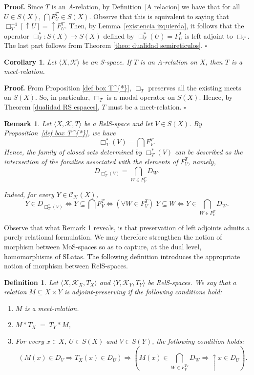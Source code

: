 \documentclass{article}
\newtheorem{definition}{\bf Definition}[section]
\newtheorem{remark}{\bf Remark}[section]
\newtheorem{corollary}{\bf Corollary}[section]
\newenvironment{proof}
{\par\noindent\textbf{Proof. }\rm}
{\hfill$\boldsymbol{\square}$\par\vspace{0.3cm}}
\begin{document}
\begin{proof}
Since $T$ is an $A$-relation, by Definition~\ref{A relacion} we have that for all $U\in S(X)$, $\bigcap F_U^{T} \in S(X)$. Observe that this is equivalent to saying that $\Box_T^{-1}[\uparrow U]=\uparrow F_U^{T}$. Then, by Lemma~\ref{existencia izquierda}, it follows that the operator $\Box_{T}^{\ast}\colon S(X)\to S(X)$ defined by $\Box_{T}^{\ast}(U)=F_U^{T}$ is left adjoint to $\Box_T$. The last part follows from Theorem \ref{theo: dualidad semireticulos}. 
\end{proof}


\begin{corollary}\label{A-rel is meet-rel}
Let $\langle X, \mathcal{K}\rangle$ be an S-space. If $T$ is an A-relation on $X$, then $T$ is a meet-relation.
\end{corollary}
\begin{proof}
    From Proposition \ref{def box T^{*}}, $\Box_T$ preserves all the existing meets on $S(X)$. So, in particular, $\Box_T$ is a modal operator on $S(X)$. Hence, by Theorem \ref{dualidad RS espaces}, $T$ must be a meet-relation.
\end{proof}

\begin{remark}\label{interseccion}
Let $\langle X, \mathcal{K}, T \rangle$ be a RelS-space and let $V \in S(X)$. By Proposition~\ref{def box T^{*}}, we have
\[
\Box_T^{*}(V)=\bigcap F_V^T.
\]
Hence, the family of closed sets determined by $\Box_T^{*}(V)$ can be described as the intersection of the families associated with the elements of $F_V^T$, namely,
\[
D_{\Box_{T}^{*}(V)}
=
\bigcap_{W \in F^{T}_V} D_W.
\]

Indeed, for every $Y\in \mathcal{C}_{\mathcal{K}}(X)$,
\[
Y \in D_{\Box_{T}^{*}(V)}
\iff
Y \subseteq \bigcap F_V^T
\iff
(\forall W\in F_V^T)\; Y\subseteq W
\iff
Y\in \bigcap_{W\in F_V^T} D_W.
\]
\end{remark}

Observe that what Remark \ref{interseccion} reveals, is that preservation of left adjoints admits a purely relational formulation. We may therefore strengthen the notion of morphism between MoS-spaces so as to capture, at the dual level, homomorphisms of SLatas. The following definition introduces the appropriate notion of morphism between RelS-spaces.

\begin{definition}\label{relacion apropiada}
    Let $\langle X, \mathcal{K}_X, T_X \rangle$ and $\langle Y, \mathcal{K}_Y, T_Y \rangle$ be RelS-spaces. We say that a relation  $M\subseteq X\times Y$ is adjoint-preserving if the following conditions hold: 
    \begin{enumerate}
        \item $M$ is a meet-relation.
        \item $M * T_X \;=\; T_Y * M $,
        \item For every $x\in X$, $U\in S(X)$ and $V\in S(Y)$, the following condition holds: 
        \[(M(x) \in D_V \Rightarrow T_X(x)\in D_U)\Rightarrow ( M(x) \in \bigcap_{W \in F^{T_Y}_V}D_W \Rightarrow \uparrow x \in D_U).\]
    \end{enumerate}
\end{definition}
\end{document}
